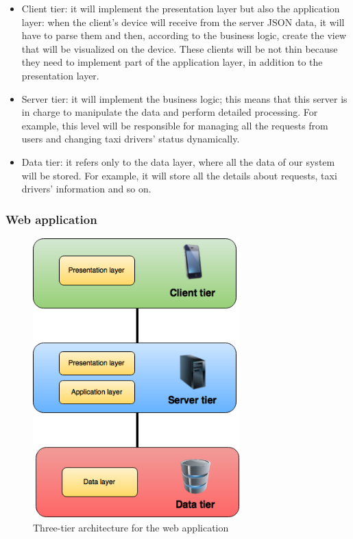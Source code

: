     \begin{itemize}
        \item Client tier: it will implement the presentation layer but also the application layer:  when the client's device will receive from the server JSON data, it will have to parse them and then, according to the business logic, create the view that will be visualized on the device.
        These clients will be not thin because they need to implement part of the application layer, in addition to the presentation layer.
        \item Server tier: it will implement the business logic; this means that this server is in charge to manipulate the data and perform detailed processing. For example, this level will be responsible for managing all the requests from users and changing taxi drivers' status dynamically. 
        \item Data tier: it refers only to the data layer, where all the data of our system will be stored. For example, it will store all the details about requests, taxi drivers' information and so on.
    \end{itemize}

\subsubsection{Web application}

    \begin{figure}[H]
        \centering
        \includegraphics[width=8cm]{./Images/WebApplication.png}
        \caption{Three-tier architecture for the web application}
    \end{figure}
    
